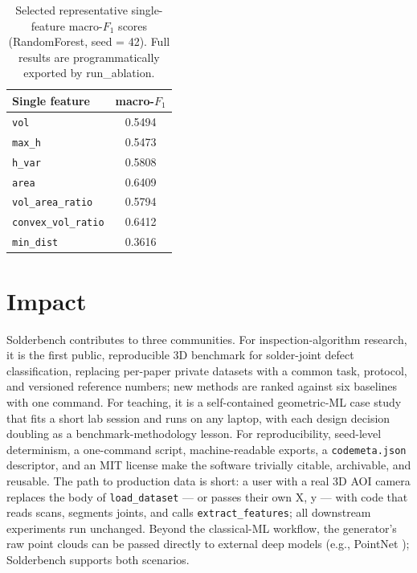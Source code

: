 \documentclass[3p]{elsarticle}
\begin{document}
\begin{table}[htbp]
\centering
\caption{Selected representative single-feature macro-$F_1$ scores (RandomForest, seed = 42). Full results are programmatically exported by run\_ablation.}
\begin{tabular}{lc}
\toprule
\textbf{Single feature} & \textbf{macro-$F_1$} \\
\midrule
\texttt{vol}               & 0.5494 \\
\texttt{max\_h}            & 0.5473 \\
\texttt{h\_var}            & 0.5808 \\
\texttt{area}              & 0.6409 \\
\texttt{vol\_area\_ratio}   & 0.5794 \\
\texttt{convex\_vol\_ratio} & 0.6412 \\
\texttt{min\_dist}         & 0.3616 \\
\bottomrule
\end{tabular}
\end{table}
\section{Impact}
Solderbench contributes to three communities. For inspection-algorithm research, it is the first public, reproducible 3D benchmark for solder-joint defect classification, replacing per-paper private datasets with a common task, protocol, and versioned reference numbers; new methods are ranked against six baselines with one command. For teaching, it is a self-contained geometric-ML case study that fits a short lab session and runs on any laptop, with each design decision doubling as a benchmark-methodology lesson. For reproducibility, seed-level determinism, a one-command script, machine-readable exports, a \texttt{codemeta.json} descriptor, and an MIT license make the software trivially citable, archivable, and reusable. The path to production data is short: a user with a real 3D AOI camera replaces the body of \texttt{load\_dataset} --- or passes their own X, y --- with code that reads scans, segments joints, and calls \texttt{extract\_features}; all downstream experiments run unchanged. Beyond the classical-ML workflow, the generator's raw point clouds can be passed directly to external deep models (e.g., PointNet \cite{ref8,ref9}); Solderbench supports both scenarios.
\end{document}
